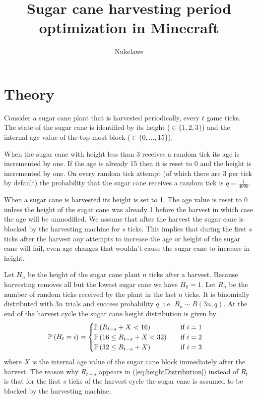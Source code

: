 


	\title{Sugar cane harvesting period optimization in Minecraft}
	\author{Nukelawe}
	\maketitle
	\section{Theory}
	Consider a sugar cane plant that is harvested periodically, every $t$ game ticks.
	The state of the sugar cane is identified by its height ($\in\{1,2,3\}$) and the
	internal age value of the top-most block ($\in\{0,\ldots,15\}$).

	When the sugar cane with height less than 3 receives a random tick its age is
	incremented by one. If the age is already 15 then it is reset to 0 and the height is
	incremented by one. On every random tick attempt (of which there are 3 per tick by
	default) the probability that the sugar cane
	receives a random tick is $q=\frac{1}{4096}$.

	When a sugar cane is harvested its height is set to 1. The age value is reset to 0
	unless the height of the sugar cane was already 1 before the harvest in which case the
	age will be unmodified. We assume that after the harvest the sugar cane is blocked by
	the harvesting machine for $s$ ticks. This implies that during the first $s$ ticks
	after the harvest any attempts to increase the age or height of the sugar cane will
	fail, even age changes that wouldn't cause the sugar cane to increase in height.

	Let $H_n$ be the height of the sugar cane plant $n$ ticks after a harvest. Because
	harvesting removes all but the lowest sugar cane we have $H_0=1$.
	Let $R_n$ be the number of random ticks received by the plant in the last $n$ ticks.
	It is binomially distributed with $3n$ trials and success probability $q$, i.e. $R_n
	\sim B(3n,q)$.
	At the end of the harvest cycle the sugar cane height distribution is given by
	\begin{align}\label{eq:heightDistribution}
		\Prob{H_t=i} &= \begin{cases}
			\Prob{R_{t-s}+X < 16} &\text{if }i=1
			\\\Prob{16 \leq R_{t-s}+X < 32} \quad&\text{if }i=2
			\\\Prob{32 \leq R_{t-s}+X} &\text{if }i=3
		\end{cases}
	\end{align}
	where $X$ is the internal age value of the sugar cane block immediately after the
	harvest. The reason why $R_{t-s}$ appears in (\ref{eq:heightDistribution}) instead of
	$R_t$ is that for the first $s$ ticks of the harvest cycle the sugar cane is assumed
	to be blocked by the harvesting machine.

